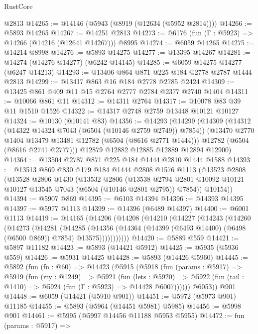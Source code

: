 \begin{lexlean}{RustCore}
\begin{coremodule}
    @2813
@14265 := @14146 (@5943 (@8919 (@12634 (@5952 @2814))))
@14266 := @5893 @14265
@14267 := @14251 @2813
@14273 := @6176 (fun (Γ : @5923) => @14266 (@14216 (@12641 @14267))) @8995
@14274 := @6059 @14265
@14275 := @14214 @8998
@14276 := @5893 @14275
@14277 := @13395 @14267
@14281 := @14274 (@14276 @14277) (@6242 @14145)
@14285 := @6059 @14275 @14277 (@6247 @14213)
@14293 := @13406 @864 @871 @225 @184 @2778 @2787 @1444 @2813
@14299 := @13417 @863 @16 @184 @2778 @2785 @2424
@14309 := @13425 @861 @409 @11 @15 @2764 @2777 @2784 @2377 @2740 @1404
@14311 := @10066 @861 @11
@14312 := @14311 @2764
@14317 := @10078 @83 @39 @11 @1510 @1526
@14322 := @14317 @2748 @2759 @13448 @10121 @10127
@14324 := @10130 (@10141 @83)
@14356 := @14293
    (@14299
      (@14309
        (@14312 (@14322 @14324 @7043 (@6504 (@10146 @2759 @2749)) @7854))
        (@13470 @2770 @1404 @13479 @13481 @12782 (@6504 (@8616 @2771 @1444)))
        @12782
        (@6504 (@8616 @2741 @2777)))
      @12879
      @12882
      @12885
      @12889
      @12894
      @12900)
@14364 := @13504 @2787 @871 @225 @184 @1444 @2810 @1444 @1588
@14393 := @13513
    @869
    @830
    @179
    @184
    @1444
    @2808
    @1576
    @1113
    (@13523
      @2808
      (@13528
        @2806
        @1430
        (@13532
          @2806
          (@13538 @2794 @2801 @10092 @10121 @10127 @13545 @7043 (@6504 (@10146 @2801 @2795)) @7854))
        @10154))
@14394 := @5907 @869
@14395 := @6103 @14394
@14396 := @14393 @14395
@14397 := @5977 @1113
@14399 := @14396 (@6489 @14397)
@14400 := @6001 @1113
@14419 := @14165
    (@14206
      (@14208
        (@14210
          (@14227
            (@14243
              (@14260
                (@14273
                  (@14281
                    (@14285
                      (@14356
                        (@14364 (@14399 (@6493 @14400) (@6498 (@6500 @869)) @7854) @13575)))))))))))
@14420 := @5889 @559
@14421 := @5897 @11182
@14423 := @5893 (@14421 @5912)
@14425 := @5935 (@5936 @559)
@14426 := @5931 @14425
@14428 := @5893 (@14426 @5960)
@14445 := @5892
    (fun (fn : @60) =>
    @14423
      (@5915
        (@5918
          (fun (params : @5917) =>
          @5919
            (fun (rty : @1249) =>
            @5921
              (fun (lets : @5920) =>
              @5922 (fun (tail : @1410) => @5924 (fun (Γ : @5923) => @14428 @6007))))))
        @6053))
    @901
@14448 := @6059 (@14421 (@5910 @901))
@14451 := @5972 (@5973 @901) @11185
@14455 := @5893 (@5964 (@14451 @5981) @5985)
@14456 := @5998 @901
@14461 := @5995 (@5997 @14456 @11188 @5953 @5955)
@14472 := fun (params : @5917) =>

\end{coremodule}
\end{lexlean}
